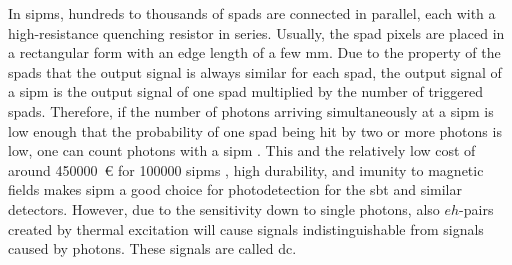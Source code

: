 In \acp{sipm}, hundreds to thousands of \acp{spad} are connected in parallel, each with a high-resistance quenching resistor in series. 
Usually, the \ac{spad} pixels are placed in a rectangular form with an edge length of a few \si{\milli\meter}.
Due to the property of the \acp{spad} that the output signal is always similar for each \ac{spad}, the output signal of a \ac{sipm} is the output signal of one \ac{spad} multiplied by the number of triggered \acp{spad}.
Therefore, if the number of photons arriving simultaneously at a \ac{sipm} is low enough that the probability of one \ac{spad} being hit by two or more photons is low, one can count photons with a \ac{sipm} \cite{ACERBI201916}.
This and the relatively low cost of around \SI{450000}{\euro} for \num{100000} \acp{sipm} , high durability, and imunity to magnetic fields \cite{ACERBI201916,HamamatsuMPPCTech} makes \ac{sipm} a good choice for photodetection for the \ac{sbt} and similar detectors.
However, due to the sensitivity down to single photons, also $eh$-pairs created by thermal excitation will cause signals indistinguishable from signals caused by photons.
These signals are called \ac{dc}.







